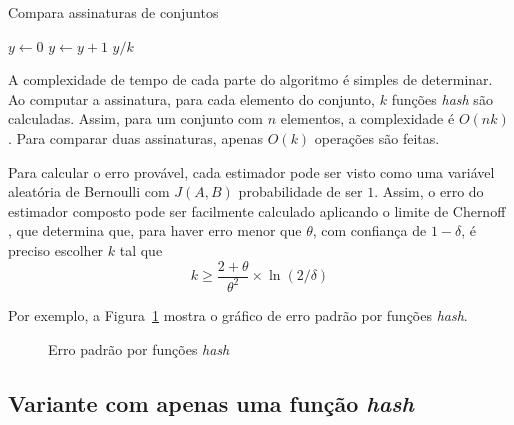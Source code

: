 \begin{algorithm}
\linespread{1}\selectfont
\caption{Compara assinaturas de conjuntos}
\label{alg:min:hashcompare}
\begin{algorithmic}[1]
    \State $y \gets 0$
            \State $y \gets y + 1$
        \EndIf
	\EndFor
	\Return $y/k$
\EndFunction
\end{algorithmic}
\end{algorithm}

A complexidade de tempo de cada parte do algoritmo é simples de determinar. Ao computar a assinatura, para cada elemento do conjunto, $k$ funções \emph{hash} são calculadas. Assim, para um conjunto com $n$ elementos, a complexidade é $O(nk)$. Para comparar duas assinaturas, apenas $O(k)$ operações são feitas.

Para calcular o erro provável, cada estimador pode ser visto como uma variável aleatória de Bernoulli com $J(A, B)$ probabilidade de ser $1$. Assim, o erro do estimador composto pode ser facilmente calculado aplicando o limite de Chernoff \cite{cohen2001finding,teixeira2012min}, que determina que, para haver erro menor que $\theta$, com confiança de $1-\delta$, é preciso escolher $k$ tal que 
\[
    k \geq \frac{2+\theta}{\theta^2} \times \ln(2/\delta)
\]

Por exemplo, a Figura~\ref{fig:min:prob} mostra o gráfico de erro padrão por funções \emph{hash}.

\begin{figure}[!htbp]
\centering
{}
\caption{Erro padrão por funções \emph{hash}}
\label{fig:min:prob}
\end{figure}

\subsection{Variante com apenas uma função \emph{hash}}

